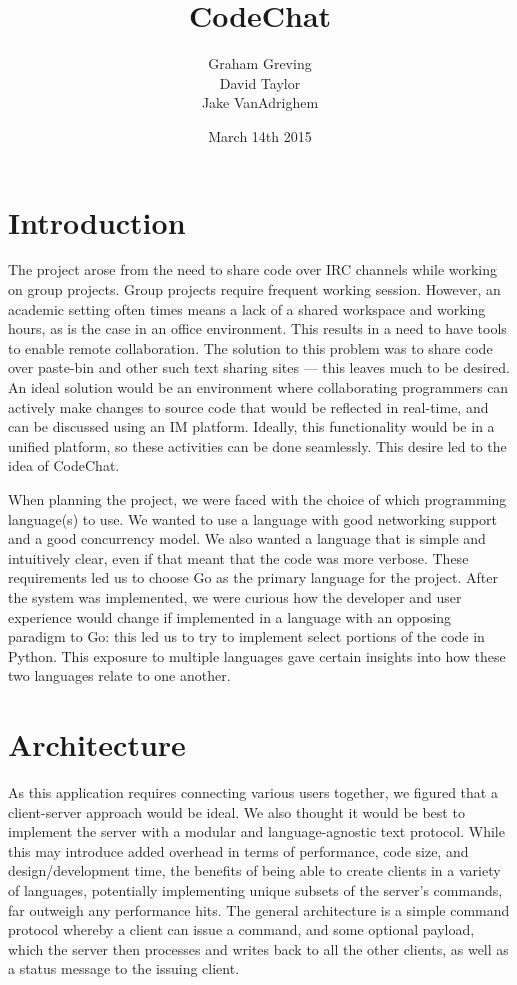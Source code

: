 \documentclass[10pt, letterpaper]{article}
\title{CodeChat}
\author{Graham Greving \\ David Taylor \\ Jake VanAdrighem}
\date{March 14th 2015}
\begin{document}
\maketitle

\section*{Introduction}

The project arose from the need to share code over IRC channels while working 
on group projects. Group projects require frequent working session. However, 
an academic setting often times means a lack of a shared workspace and 
working hours, as is the case in an office environment. This results in a 
need to have tools to enable remote collaboration. The solution to this 
problem was to share code over paste-bin and other such text sharing sites 
--- this leaves much to be desired. An ideal solution would be an environment 
where collaborating programmers can actively make changes to source code that 
would be reflected in real-time, and can be discussed using an IM platform. 
Ideally, this functionality would be in a unified platform, so these 
activities can be done seamlessly. This desire led to the idea of CodeChat.

When planning the project, we were faced with the choice of 
which programming language(s) to use. We wanted to use a language with good 
networking support and a good concurrency model. We also wanted a language 
that is simple and intuitively clear, even if that meant that the code was 
more verbose. These requirements led us to choose Go as the primary language 
for the project. After the system was implemented, we were curious how the 
developer and user experience would change if implemented in a language with 
an opposing paradigm to Go: this led us to try to implement select portions 
of the code in Python. This exposure to multiple languages gave certain 
insights into how these two languages relate to one another.

\section*{Architecture}

As this application requires connecting various users together, we figured 
that a client-server approach would be ideal. We also thought it would be 
best to implement the server with a modular and language-agnostic text 
protocol. While this may introduce added overhead in terms of performance, 
code size, and design/development time, the benefits of being able to create 
clients in a variety of languages, potentially implementing unique 
subsets of the server's commands, far outweigh any performance hits. The 
general architecture is a simple command protocol whereby a client can 
issue a command, and some optional payload, which the server then processes  
and writes back to all the other clients, as well as a status message to the 
issuing client.
\end{document}
